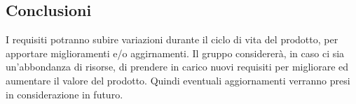 	\subsection{Conclusioni}
		I requisiti potranno subire variazioni durante il ciclo di vita del prodotto, per apportare miglioramenti e/o aggirnamenti. Il gruppo considererà, in caso ci sia un'abbondanza di risorse, di prendere in carico nuovi requisiti per migliorare ed aumentare il valore del prodotto.
		Quindi eventuali aggiornamenti verranno presi in considerazione in futuro.
